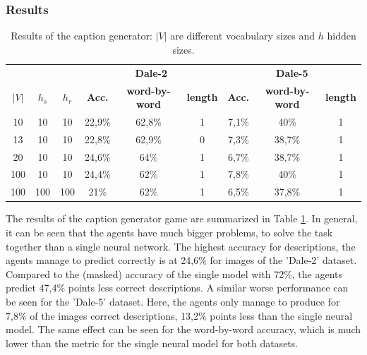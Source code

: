 \subsubsection*{Results}
\begin{table}[h]
    \centering
    \begin{tabular}{ccc|ccc|ccc}
        \toprule
              &         &         & \multicolumn{3}{c}{\textbf{Dale-2}} & \multicolumn{3}{c}{\textbf{Dale-5}}                                                                             \\\cmidrule(lr){4-6}\cmidrule(lr){7-9}
        $|V|$ & $h_{s}$ & $h_{r}$ & \textbf{Acc.}                       & \textbf{word-by-word}               & \textbf{length} & \textbf{Acc.} & \textbf{word-by-word} & \textbf{length} \\\midrule
        {10}  & {10}    & {10}    & {22,9\%}                            & {62,8\%}                            & {1}             & {7,1\%}       & {40\%}                & {1}             \\
        {13}  & {10}    & {10}    & {22,8\%}                            & {62,9\%}                            & {0}             & {7,3\%}       & {38,7\%}              & {1}             \\
        {20}  & {10}    & {10}    & {24,6\%}                            & {64\%}                              & {1}             & {6,7\%}       & {38,7\%}              & {1}             \\
        {100} & {10}    & {10}    & {24,4\%}                            & {62\%}                              & {1}             & {7,8\%}       & {40\%}                & {1}             \\
        {100} & {100}   & {100}   & {21\%}                              & {62\%}                              & {1}             & {6,5\%}       & {37,8\%}              & {1}             \\
        \bottomrule
    \end{tabular}
    \caption{Results of the caption generator: $|V|$ are different vocabulary sizes and $h$ hidden sizes.}
    \label{tab:results_caption_generator_game}
\end{table}

The results of the caption generator game are summarized in Table \ref{tab:results_caption_generator_game}.
In general, it can be seen that the agents have much bigger problems, to solve the task together than a single neural network.
The highest accuracy for descriptions, the agents manage to predict correctly is at 24,6\% for images of the 'Dale-2' dataset.
Compared to the (masked) accuracy of the single model with 72\%, the agents predict 47,4\% points less correct descriptions.
A similar worse performance can be seen for the 'Dale-5' dataset.
Here, the agents only manage to produce for 7,8\% of the images correct descriptions, 13,2\% points less than the single neural model.
The same effect can be seen for the word-by-word accuracy, which is much lower than the metric for the single neural model for both datasets.

